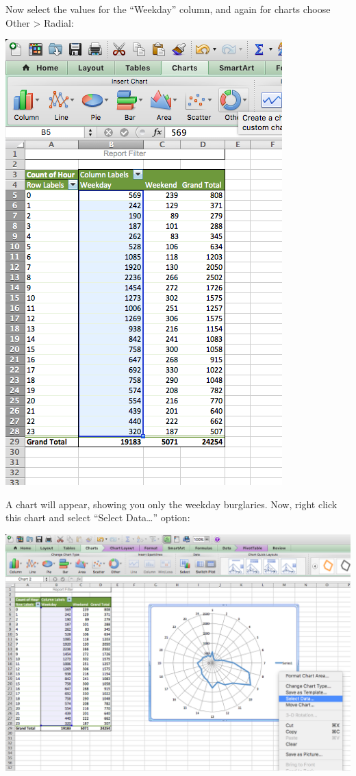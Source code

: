 \documentclass[
]{book}
\begin{document}
Now select the values for the ``Weekday'' column, and again for charts choose Other \textgreater{} Radial:

\includegraphics{imgs/hr_r_20.png}

A chart will appear, showing you only the weekday burglaries. Now, right click this chart and select ``Select Data\ldots{}'' option:

\includegraphics{imgs/hr_r_21.png}
\end{document}

